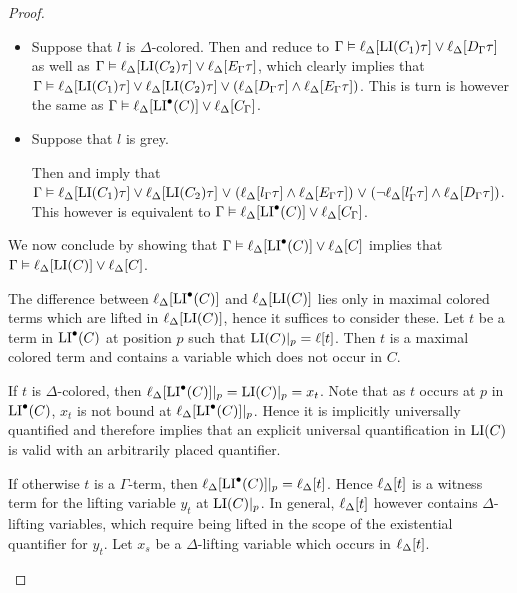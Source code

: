 \documentclass[,%
	draft=false,%
	numbers=noendperiod
	11pt,
	a4paper,
	oneside,%
	openany,
]{memoir}
\begin{document}
\begin{proof}
\begin{description}
\begin{itemize}
				\item Suppose that $l$ is $\Delta$-colored.
					Then \markA{} and \markB{} reduce to 
					$\Gamma \vDash \ell_{\Delta}[\operatorname{LI}(C_1)\tau] \lor \ell_{\Delta}[D_\Gamma\tau]$
					as well as
					$\Gamma \vDash \ell_{\Delta}[\operatorname{LI}(C_2)\tau] \lor \ell_{\Delta}[E_\Gamma\tau]$, 
					which clearly implies that 
					$\Gamma \vDash \ell_{\Delta}[\operatorname{LI}(C_1)\tau] \lor \ell_{\Delta}[\operatorname{LI}(C_2)\tau] \lor (\ell_{\Delta}[D_\Gamma\tau] \land \ell_{\Delta}[E_\Gamma\tau])$.
					This is turn is however the same as
					$\Gamma \vDash \ell_{\Delta}[\operatorname{LI}^\bullet(C)] \lor \ell_{\Delta}[C_\Gamma]$.

				\item Suppose that $l$ is grey.

					Then \markA{} and \markB{} imply that
					$\Gamma \vDash
					\ell_{\Delta}[\operatorname{LI}(C_1)\tau] \lor
					\ell_{\Delta}[\operatorname{LI}(C_2)\tau] \;{\lor}\;\allowbreak
					(\ell_{\Delta}[l_\Gamma\tau] \land \ell_{\Delta}[E_\Gamma\tau]) \;{\lor}\;\allowbreak
					(\lnot\ell_{\Delta}[l'_\Gamma\tau] \land \ell_{\Delta}[D_\Gamma\tau])$.
					This however is equivalent to
					$\Gamma \vDash \ell_{\Delta}[\operatorname{LI}^\bullet(C)] \lor \ell_{\Delta}[C_\Gamma]$.

			\end{itemize}


			We now conclude by showing that 
			$\Gamma \vDash \ell_{\Delta}[\operatorname{LI}^\bullet(C)] \lor \ell_{\Delta}[C]$
			implies that 
			$\Gamma \vDash \ell_{\Delta}[\operatorname{LI}(C)] \lor \ell_{\Delta}[C]$.

			The difference between $\ell_{\Delta}[\operatorname{LI}^\bullet(C)]$ and $\ell_{\Delta}[\operatorname{LI}(C)]$ lies only in maximal colored terms which are lifted in $\ell_{\Delta}[\operatorname{LI}(C)]$, hence it suffices to consider these.
			Let $t$ be a term in $\operatorname{LI}^\bullet(C)$ at position $p$ such that $\operatorname{LI}(C)|_{p} = \ell[t]$.
			Then $t$ is a maximal colored term and contains a variable which does not occur in $C$.

			If $t$ is $\Delta$-colored, then $\ell_{\Delta}[\operatorname{LI}^\bullet(C)]|_{p} = \operatorname{LI}(C)|_{p} = x_t$.
			Note that as $t$ occurs at $p$ in $\operatorname{LI}^\bullet(C)$, $x_t$ is not bound at $\ell_{\Delta}[\operatorname{LI}^\bullet(C)]|_{p}$.
			Hence it is implicitly universally quantified and therefore implies that an explicit universal quantification in $\operatorname{LI}(C)$ is valid with an arbitrarily placed quantifier.  

			If otherwise $t$ is a $\Gamma$-term, then $\ell_{\Delta}[\operatorname{LI}^\bullet(C)]|_{p} = \ell_{\Delta}[t]$.
			Hence $\ell_{\Delta}[t]$ is a witness term for the lifting variable $y_t$ at $\operatorname{LI}(C)|_{p}$.
			In general, $\ell_{\Delta}[t]$ however contains $\Delta$-lifting variables, which require being lifted in the scope of the existential quantifier for $y_t$. 
			Let $x_s$ be a $\Delta$-lifting variable which occurs in $\ell_{\Delta}[t]$. 


\end{description}
\end{proof}
\end{document}

